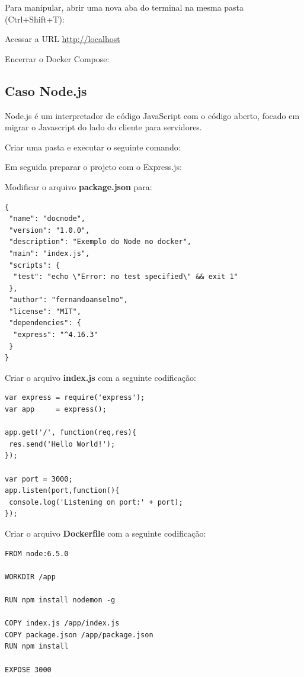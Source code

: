 \documentclass[a4paper,11pt]{article}
\begin{document}
Para manipular, abrir uma nova aba do terminal na mesma pasta (Ctrl+Shift+T): \\

Acessar a URL \url{http://localhost}

Encerrar o Docker Compose: \\

\subsection{Caso Node.js}
Node.js é um interpretador de código JavaScript com o código aberto, focado em migrar o Javascript do lado do cliente para servidores. 

Criar uma pasta e executar o seguinte comando: \\

Em seguida preparar o projeto com o Express.js: \\

Modificar o arquivo \textbf{package.json} para:
\begin{lstlisting}[]
{
 "name": "docnode",
 "version": "1.0.0",
 "description": "Exemplo do Node no docker",
 "main": "index.js",
 "scripts": {
  "test": "echo \"Error: no test specified\" && exit 1"
 },
 "author": "fernandoanselmo",
 "license": "MIT",
 "dependencies": {
  "express": "^4.16.3"
 }
}
\end{lstlisting}

Criar o arquivo \textbf{index.js} com a seguinte codificação:
\begin{lstlisting}[]
var express = require('express');
var app     = express();

app.get('/', function(req,res){
 res.send('Hello World!');
});

var port = 3000;
app.listen(port,function(){
 console.log('Listening on port:' + port);
});
\end{lstlisting}

Criar o arquivo \textbf{Dockerfile} com a seguinte codificação:
\begin{lstlisting}[]
FROM node:6.5.0

WORKDIR /app

RUN npm install nodemon -g

COPY index.js /app/index.js
COPY package.json /app/package.json
RUN npm install

EXPOSE 3000
\end{lstlisting}
\end{document}
